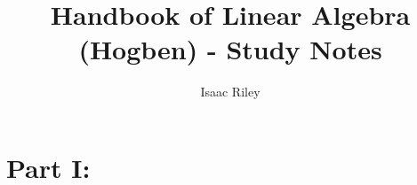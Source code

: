 \documentclass[a4paper]{article}
\title{Handbook of Linear Algebra (Hogben) - Study Notes}
\author{Isaac Riley}
\begin{document}
\maketitle
\tableofcontents
\newpage

\section*{Part I: }

\section{}

\subsection{}

\subsubsection{}


\section{}

\section{}

\section{}

\section{}

\section{}
\end{document}

